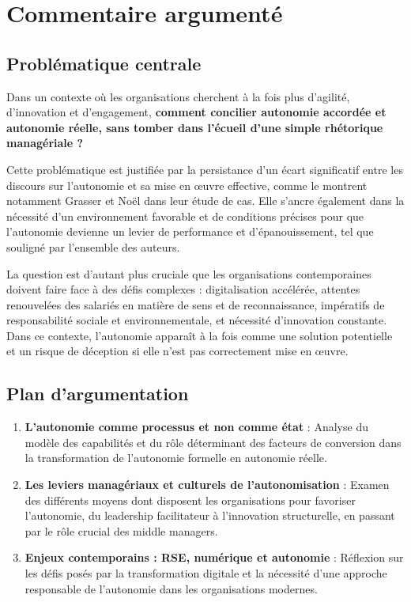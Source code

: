 \documentclass{rapportECL}
\begin{document}
\section*{Commentaire argumenté}

\subsection*{Problématique centrale}

Dans un contexte où les organisations cherchent à la fois plus d'agilité, d'innovation et d'engagement, \textbf{comment concilier autonomie accordée et autonomie réelle, sans tomber dans l'écueil d'une simple rhétorique managériale ?}

Cette problématique est justifiée par la persistance d'un écart significatif entre les discours sur l'autonomie et sa mise en œuvre effective, comme le montrent notamment Grasser et Noël dans leur étude de cas. Elle s'ancre également dans la nécessité d'un environnement favorable et de conditions précises pour que l'autonomie devienne un levier de performance et d'épanouissement, tel que souligné par l'ensemble des auteurs.

La question est d'autant plus cruciale que les organisations contemporaines doivent faire face à des défis complexes : digitalisation accélérée, attentes renouvelées des salariés en matière de sens et de reconnaissance, impératifs de responsabilité sociale et environnementale, et nécessité d'innovation constante. Dans ce contexte, l'autonomie apparaît à la fois comme une solution potentielle et un risque de déception si elle n'est pas correctement mise en œuvre.

\subsection*{Plan d'argumentation}

\begin{enumerate}
\item \textbf{L'autonomie comme processus et non comme état} : Analyse du modèle des capabilités et du rôle déterminant des facteurs de conversion dans la transformation de l'autonomie formelle en autonomie réelle.

\item \textbf{Les leviers managériaux et culturels de l'autonomisation} : Examen des différents moyens dont disposent les organisations pour favoriser l'autonomie, du leadership facilitateur à l'innovation structurelle, en passant par le rôle crucial des middle managers.

\item \textbf{Enjeux contemporains : RSE, numérique et autonomie} : Réflexion sur les défis posés par la transformation digitale et la nécessité d'une approche responsable de l'autonomie dans les organisations modernes.
\end{enumerate}
\end{document}
